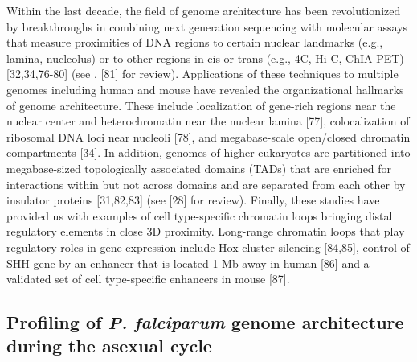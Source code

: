 Within the last decade, the field of genome architecture has been
revolutionized by breakthroughs in combining next generation sequencing with
molecular assays that measure proximities of DNA regions to certain nuclear
landmarks (e.g., lamina, nucleolus) or to other regions in cis or trans (e.g.,
4C, Hi-C, ChIA-PET) \citep{duan:three-dimensional,
lieberman-aiden:comprehensive, fullwood:oestrogen-receptor-alpha-bound,
guelen:domain, vankoningsbruggen:high-resolution, vogel:detection,
zhao:circular} [32,34,76-80] (see \citep{vansteensel:genomic}, [81] for review).
Applications of these
techniques to multiple genomes including human and mouse have revealed the
organizational hallmarks of genome architecture. These include localization of
gene-rich regions near the nuclear center and heterochromatin near the nuclear
lamina \citep{guelen:domain} [77], colocalization of ribosomal DNA loci near
nucleoli \citep{vankningsbruggen:high-resolution}[78], and
megabase-scale open/closed chromatin compartments
\citep{lieberman-aiden:comprehensive}[34]. In addition, genomes
of higher eukaryotes are partitioned into megabase-sized topologically
associated domains (TADs) that are enriched for interactions within but not
across domains and are separated from each other by insulator proteins
\citep{dixon:topological, nora:spatial, sofueva:cohesin-mediated} [31,82,83]
(see \citep{nora:segmental} [28] 
for review). Finally, these studies have provided us with
examples of cell type-specific chromatin loops bringing distal regulatory
elements in close 3D proximity. Long-range chromatin loops that play
regulatory roles in gene expression include Hox cluster silencing
\citep{ferraiuolo:three-dimensional, rousseau:hox}[84,85],
control of SHH gene by an enhancer that is located 1 Mb away in human
\citep{li:extensive} [86] and
a validated set of cell type-specific enhancers in mouse \citep{shen:map} [87].

\subsection{Profiling of \textit{P. falciparum} genome architecture during the asexual
cycle}

